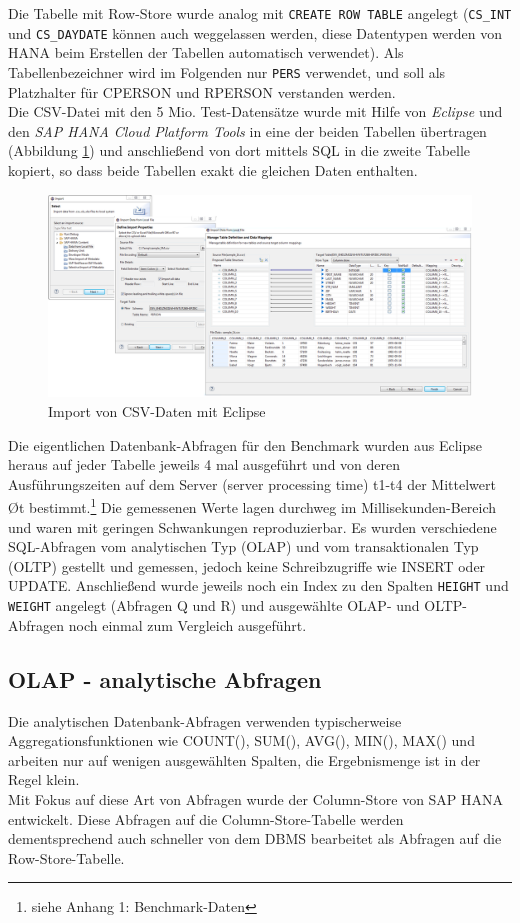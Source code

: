 Die Tabelle mit Row-Store wurde analog mit \texttt{CREATE ROW TABLE} angelegt 
(\texttt{CS\_INT} und \texttt{CS\_DAYDATE} können auch weggelassen werden, diese Datentypen werden von HANA
beim Erstellen der Tabellen automatisch verwendet).
Als Tabellenbezeichner wird im Folgenden nur \texttt{PERS} verwendet, und soll als 
Platzhalter für CPERSON und RPERSON verstanden werden.\\
Die CSV-Datei mit den 5 Mio. Test-Datensätze wurde mit Hilfe von \textit{Eclipse} und 
den \textit{SAP HANA Cloud Platform Tools} in eine der beiden Tabellen übertragen 
(Abbildung \ref{import})
und anschließend von dort mittels SQL in die zweite Tabelle kopiert, so dass beide
Tabellen exakt die gleichen Daten enthalten.

\begin{figure}[h]
\centering
\includegraphics[width=.99\textwidth]{img/import.png}
\caption[Import von CSV-Daten mit Eclipse]{Import von CSV-Daten mit Eclipse\footnotemark}
\label{import}
\end{figure}

Die eigentlichen Datenbank-Abfragen für den Benchmark wurden aus Eclipse heraus 
auf jeder Tabelle jeweils 4 mal ausgeführt und von deren Ausführungszeiten auf dem 
Server (server processing time) t1-t4 der Mittelwert Øt bestimmt.\footnote{siehe Anhang 1: Benchmark-Daten}
Die gemessenen Werte lagen durchweg im Millisekunden-Bereich und waren mit geringen
Schwankungen reproduzierbar. Es wurden verschiedene SQL-Abfragen vom analytischen Typ (OLAP) 
und vom transaktionalen Typ (OLTP) gestellt und gemessen, jedoch keine Schreibzugriffe wie
INSERT oder UPDATE.
Anschließend wurde jeweils noch ein Index zu den Spalten \texttt{HEIGHT} und 
\texttt{WEIGHT} angelegt (Abfragen Q und R) und ausgewählte OLAP- und OLTP-Abfragen
noch einmal zum Vergleich ausgeführt.

\subsection{OLAP - analytische Abfragen}
Die analytischen Datenbank-Abfragen verwenden typischerweise Aggregationsfunktionen
wie COUNT(), SUM(), AVG(), MIN(), MAX() und arbeiten nur auf wenigen ausgewählten 
Spalten, die Ergebnismenge ist in der Regel klein.\\
Mit Fokus auf diese Art von Abfragen wurde der Column-Store von SAP HANA entwickelt.
Diese Abfragen auf die Column-Store-Tabelle werden dementsprechend auch schneller 
von dem DBMS bearbeitet als Abfragen auf die Row-Store-Tabelle.


